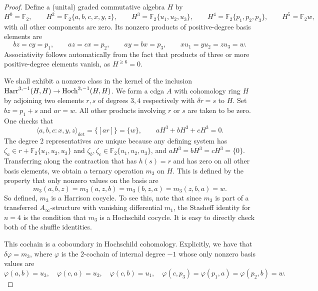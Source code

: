 \documentclass[11pt]{article}
\theoremstyle{definition}
\theoremstyle{definition}
\begin{document}
\begin{proof}
Define a (unital) graded commutative algebra $H$ by
\begin{equation*}
 H^0=\mathbb F_2,\qquad H^2=\mathbb F_2\{a,b,c,x,y,z\},\qquad H^3=\mathbb F_2\{u_1,u_2,u_3\},\qquad H^4=\mathbb F_2\{p_1,p_2,p_3\}, \qquad H^5=\mathbb F_2w,
\end{equation*}
with all other components are zero. Its nonzero products of positive-degree basis elements are
\begin{equation}
\label{ecu: auxiliar}
 bz=cy=p_1,\qquad az=cx=p_2,\qquad ay=bx=p_3,
 \qquad xu_1=yu_2=zu_3=w.
\end{equation}
Associativity follows automatically from the fact that products
of three or more positive-degree elements vanish, as $H^{\geq 6}=0$.



We shall exhibit a nonzero class in the kernel of the inclusion $\operatorname{Harr}^{3,-1} (H,H) \to \operatorname{Hoch}^{3,-1}(H , H)$.
We form a cdga $A$ with cohomology ring $H$ by adjoining two elements $r,s$ of degrees $3,4$ respectively with $\delta r=s$ to $H$.
Set $b z = p_1 + s$ and $a r = w$. 
All other products involving $r$ or $s$ are taken to be zero.
One checks that
\begin{equation*}
 \langle a,b,c:x,y,z\rangle_{\det}=\{[ar]\}=\{w\},  \qquad aH^3+bH^3+cH^3=0.
\end{equation*}
The degree $2$ representatives are unique because any defining system has
$\zeta_a\in r+\mathbb F_2\{u_1,u_2,u_3\}$ and $\zeta_b,\zeta_c\in\mathbb F_2\{u_1,u_2,u_3\}$,
and $aH^3 = bH^3  =cH^3 = \{0\}$.
Transferring along the contraction that has $h(s)=r$ and has zero on all other basis elements, we obtain a ternary operation $m_3$ on $H$. 
This is defined by the property that only nonzero values on the basis are
\begin{equation*}
 m_3(a,b,z) = m_3(a,z,b)=m_3(b,z,a)=m_3(z,b,a)=w.
\end{equation*}
So defined, $m_3$ is a Harrison cocycle. 
To see this, note that since $m_3$ is part of a transferred $A_\infty$-structure with vanishing differential $m_1$, the Stasheff identity for $n=4$ is the condition that $m_3$ is a Hochschild cocycle. 
It is easy to directly check both of the shuffle identities.


This cochain is a coboundary in Hochschild cohomology. 
Explicitly, we have that $\delta \varphi = m_3$, where $\varphi$ is the $2$-cochain of internal degree $-1$ whose only nonzero basis values are
\begin{equation*}
\varphi(a,b) = u_3,\quad \varphi(c,a)=u_2,\quad \varphi(c,b)=u_1,\quad 
\varphi(c,p_3) = \varphi(p_1,a) = \varphi(p_2,b)=w.
\end{equation*}



\end{proof}
\end{document}
